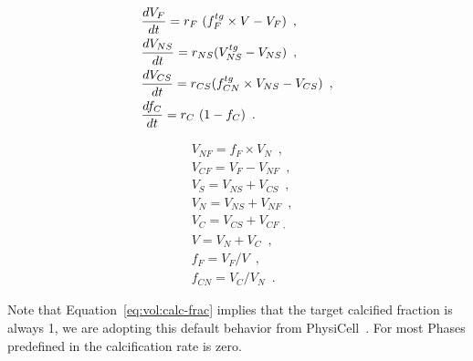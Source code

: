 \begin{subequations}\label{eq:vol-dyn}
    \begin{align}
        &\frac{dV_F}{dt} = r_F\,\,(f^{tg}_F\times V - V_F)\,\,\,, \label{eq:vol:fluid} \\
        &\frac{dV_{NS}}{dt} = r_{NS} (V^{tg}_{NS} - V_{NS})\,\,\,, \label{eq:vol:nuc-sol} \\
        &\frac{dV_{CS}}{dt} = r_{CS} (f^{tg}_{CN} \times V_{NS} - V_{CS})\,\,\,, \label{eq:vol:cyt-sol} \\
        &\frac{df_C}{dt} = r_C\,\,(1 - f_C)\,\,\,. \label{eq:vol:calc-frac}
    \end{align}
\end{subequations}

\begin{subequations}\label{eq:vol-rel}
    \begin{align}
        &V_{NF} = f_F \times V_N\,\,\,, \label{eq:vol:nuc-fluid}\\
        &V_{CF} = V_F - V_{NF}\,\,\,,\label{eq:vol:cyt-fluid} \\
        &V_S = V_{NS} + V_{CS}\,\,\,,\label{eq:vol:solid} \\
        &V_N = V_{NS} + V_{NF}\,\,\,, \label{eq:vol:nuclear}\\
        &V_C = V_{CS} + V_{CF\,\,\,,}\label{eq:vol:cyto} \\
        &V = V_N + V_C\,\,\,,\label{eq:vol:total} \\
        &f_F = V_F / V\,\,\,,\label{eq:vol:fluid-frac} \\
        &f_{CN} = V_C / V_N\,\,\,.\label{eq:vol:cn-ratio}
    \end{align}
\end{subequations}

\noindent Note that Equation~\ref{eq:vol:calc-frac} implies that the target calcified fraction is always 1, we are adopting this default behavior from PhysiCell~\cite{ghaffarizadeh_physicell_2018}. For most Phases predefined in \pcp\space the calcification rate is zero.

